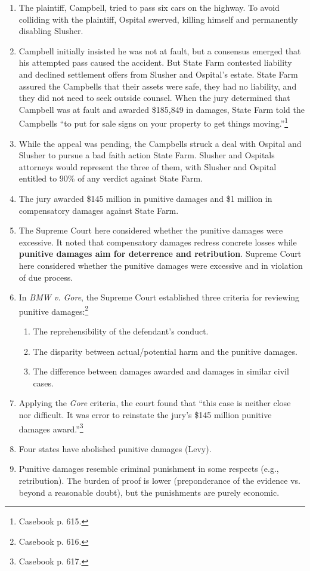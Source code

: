 \begin{enumerate}
    \item The plaintiff, Campbell, tried to pass six cars on the highway. To 
    avoid colliding with the plaintiff, Ospital swerved, killing himself and 
    permanently disabling Slusher.
    \item Campbell initially insisted he was not at fault, but a consensus 
    emerged that his attempted pass caused the accident. But State Farm 
    contested liability and declined settlement offers from Slusher and 
    Ospital's estate. State Farm assured the Campbells that their assets were 
    safe, they had no liability, and they did not need to seek outside counsel. 
    When the jury determined that Campbell was at fault and awarded \$185,849 in 
    damages, State Farm told the Campbells ``to put for sale signs on your 
    property to get things moving.''\footnote{Casebook p. 615.}
    \item While the appeal was pending, the Campbells struck a deal with Ospital 
    and Slusher to pursue a bad faith action State Farm. Slusher and Ospitals 
    attorneys would represent the three of them, with Slusher and Ospital 
    entitled to 90\% of any verdict against State Farm.
    \item The jury awarded \$145 million in punitive damages and \$1 million in 
    compensatory damages against State Farm.
    \item The Supreme Court here considered whether the punitive damages were 
    excessive. It noted that compensatory damages redress concrete losses while 
    \textbf{punitive damages aim for deterrence and retribution}.
    Supreme Court here considered whether the punitive damages were excessive 
    and in violation of due process.
    \item In \emph{BMW v. Gore}, the Supreme Court established three criteria 
    for reviewing punitive damages:\footnote{Casebook p. 616.}
    \begin{enumerate}
        \item The reprehensibility of the defendant's conduct.
        \item The disparity between actual/potential harm and the punitive 
        damages.
        \item The difference between damages awarded and damages in similar 
        civil cases.
    \end{enumerate}
    \item Applying the \emph{Gore} criteria, the court found that ``this case is 
    neither close nor difficult. It was error to reinstate the jury's \$145 
    million punitive damages award.''\footnote{Casebook p. 617.}
    \item Four states have abolished punitive damages (Levy).
    \item Punitive damages resemble criminal punishment in some respects
    (e.g., retribution). The burden of proof is lower (preponderance of the
    evidence vs. beyond a reasonable doubt), but the punishments are purely
    economic.
\end{enumerate}

